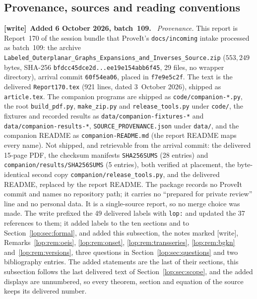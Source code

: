 \documentclass[11pt,letterpaper]{article}
\numberwithin{equation}{section}
\theoremstyle{remark}\newtheorem{remark}[theorem]{Remark}
\newcommand{\file}[1]{\nolinkurl{#1}}
\newenvironment{writenote}[1][]{\par\smallskip\begingroup\small
 \noindent\textbf{[write]}\if\relax\detokenize{#1}\relax\else~\textbf{#1.}\fi\ }%
 {\par\endgroup\smallskip}
\begin{document}
\subsection{Provenance, sources and reading conventions}\label{lop:sec:provenance}
\begin{writenote}[Added 6 October 2026, batch~109]
\emph{Provenance.} This report is Report~170 of the session bundle that
ProveIt's \file{docs/incoming} intake processed as batch~109: the archive
\file{Labeled_Outerplanar_Graphs_Expansions_and_Inverses_Source.zip}
($553{,}249$ bytes, SHA-256 \file{bfdcc45dce2d...ee19e154abb6f45}, 29 files,
no wrapper directory), arrival commit \file{60f54ea06}, placed in
\file{f7e9e5c2f}. The text is the delivered \file{Report170.tex} (921 lines,
dated 3~October 2026), shipped as \file{article.tex}. The companion programs
are shipped as \file{code/companion-*.py}, the root \file{build_pdf.py},
\file{make_zip.py} and \file{release_tools.py} under \file{code/}, the
fixtures and recorded results as \file{data/companion-fixtures-*} and
\file{data/companion-results-*}, \file{SOURCE_PROVENANCE.json} under
\file{data/}, and the companion README as \file{companion-README.md} (the
report README maps every name). Not shipped, and retrievable from the
arrival commit: the delivered 15-page PDF, the checksum manifests
\file{SHA256SUMS} (28 entries) and \file{companion/results/SHA256SUMS}
(5 entries), both verified at placement, the byte-identical second copy
\file{companion/release_tools.py}, and the delivered README, replaced by the
report README. The package records no ProveIt commit and names no
repository path; it carries no ``prepared for private review'' line and no
personal data. It is a single-source report, so no merge choice was made.
The write prefixed the 49 delivered labels with \file{lop:} and updated the
37 references to them; it added labels to the ten sections and to
Section~\ref{lop:sec:formal}, and added this subsection, the notes marked
[write], Remarks~\ref{lop:rem:oeis}, \ref{lop:rem:onset},
\ref{lop:rem:transseries}, \ref{lop:rem:bgkn} and~\ref{lop:rem:versions},
three questions in Section~\ref{lop:sec:questions} and two bibliography
entries. The added statements are the last of their sections, this
subsection follows the last delivered text of Section~\ref{lop:sec:scope},
and the added displays are unnumbered, so every theorem, section and
equation of the source keeps its delivered number.


\end{writenote}
\end{document}
